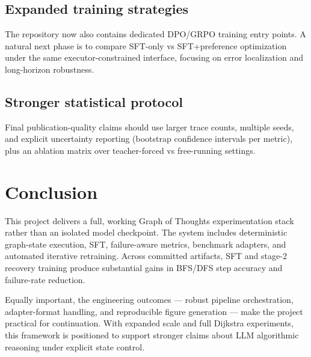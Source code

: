 \documentclass[sigplan,screen]{acmart}
\begin{document}
\subsection{Expanded training strategies}
The repository now also contains dedicated DPO/GRPO training entry points.
A natural next phase is to compare SFT-only vs SFT+preference optimization under the same executor-constrained interface, focusing on error localization and long-horizon robustness.

\subsection{Stronger statistical protocol}
Final publication-quality claims should use larger trace counts, multiple seeds, and explicit uncertainty reporting (bootstrap confidence intervals per metric), plus an ablation matrix over teacher-forced vs free-running settings.

\section{Conclusion}
This project delivers a full, working Graph of Thoughts experimentation stack rather than an isolated model checkpoint.
The system includes deterministic graph-state execution, SFT, failure-aware metrics, benchmark adapters, and automated iterative retraining.
Across committed artifacts, SFT and stage-2 recovery training produce substantial gains in BFS/DFS step accuracy and failure-rate reduction.

Equally important, the engineering outcomes --- robust pipeline orchestration, adapter-format handling, and reproducible figure generation --- make the project practical for continuation.
With expanded scale and full Dijkstra experiments, this framework is positioned to support stronger claims about LLM algorithmic reasoning under explicit state control.
\end{document}
